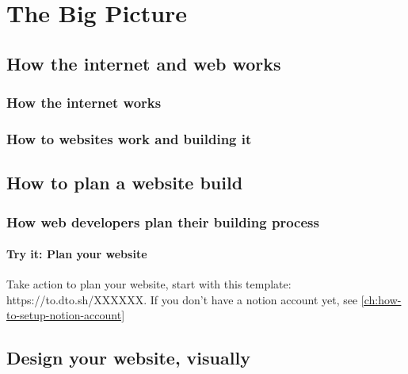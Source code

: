 \part{The Big Picture}\label{part:the-big-picture}


\chapter{How the internet and web works}\label{ch:how-the-internet-and-web-works}



\section{How the internet works}\label{sec:how-the-internet-works}


\section{How to websites work and building it}\label{sec:how-to-websites-work-and-building-it}


\chapter{How to plan a website build}\label{ch:how-to-plan-a-website-build}


\section{How web developers plan their building process}\label{sec:how-web-developers-plan-their-building-process}

\subsection{Try it: Plan your website}\label{subsec:plan-your-website}
Take action to plan your website, start with this template: https://to.dto.sh/XXXXXX. If you don't have a notion account yet, see \cref{ch:how-to-setup-notion-account}


\chapter{Design your website, visually}\label{ch:design-your-website-visually}


